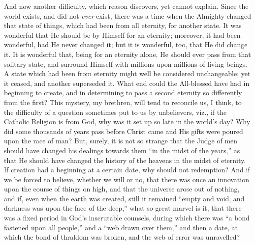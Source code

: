 And now another difficulty, which reason discovers, yet cannot
explain. Since the world exists, and did not \emph{ever} exist, there
was a time when the Almighty changed that state of things, which had
been from all eternity, for another state. It was wonderful that He
should be by Himself for an eternity; moreover, it had been wonderful,
had He never changed it; but it is wonderful, too, that He did change
it. It is wonderful that, being for an eternity alone, He should ever
pass from that solitary state, and surround Himself with millions upon
millions of living beings. A state which had been from eternity might
well be considered unchangeable; yet it ceased, and another superseded
it. What end could the All-blessed have had in beginning to create,
and in determining to pass a second eternity so differently from the
first? This mystery, my brethren, will tend to reconcile us, I think,
to the difficulty of a question sometimes put to us by unbelievers,
viz., if the Catholic Religion is from God, why was it set up so late
in the world's day? Why did some thousands of years pass before Christ
came and His gifts were poured upon the race of man? But, surely, it
is not so strange that the Judge of men should have changed his
dealings towards them ``in the midst of the years,'' as that
He should have changed the history of the heavens in the midst of
eternity. If creation had a beginning at a certain date, why should
not redemption? And if we be forced to believe, whether we will or no,
that there was once an innovation upon the course of things on high,
and that the universe arose out of nothing, and if, even when the
earth was created, still it remained ``empty and void, and
darkness was upon the face of the deep,'' what so great marvel is
it, that there was a fixed period in God's inscrutable counsels,
during which there was ``a bond fastened upon all people,''
and a ``web drawn over them,'' and then a date, at which the
bond of thraldom was broken, and the web of error was unravelled?

